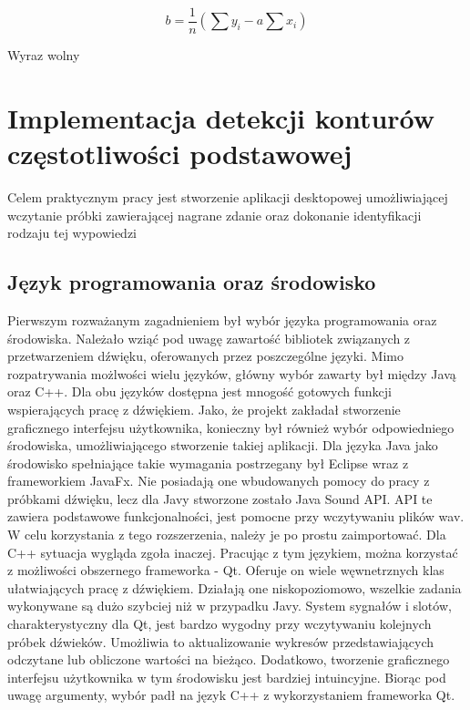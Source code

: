 \documentclass[a4paper,12 pt]{article}
\begin{document}
\begin{mycapequ}[h]

\begin{equation}
b = \frac{1}{n} (\sum{y_{i}} - a\sum{x_{i}})
\end{equation}
\caption{Wyraz wolny}
\end{mycapequ} 
\FloatBarrier

\section{Implementacja detekcji konturów częstotliwości podstawowej}
Celem praktycznym pracy jest stworzenie aplikacji desktopowej umożliwiającej wczytanie próbki zawierającej nagrane zdanie oraz dokonanie identyfikacji rodzaju tej wypowiedzi

\subsection{Język programowania oraz środowisko}
Pierwszym rozważanym zagadnieniem był wybór języka programowania oraz środowiska. Należało wziąć pod uwagę zawartość bibliotek związanych z przetwarzeniem dźwięku, oferowanych przez poszczególne języki.
Mimo rozpatrywania możlwości wielu języków, główny wybór zawarty był między Javą oraz C++. Dla obu języków dostępna jest mnogość gotowych funkcji wspierających pracę z dźwiękiem. Jako, że projekt zakładał stworzenie graficznego interfejsu użytkownika, 
konieczny był również wybór odpowiedniego środowiska, umożliwiającego stworzenie takiej aplikacji. Dla języka Java jako środowisko spełniające takie wymagania postrzegany był Eclipse wraz z frameworkiem JavaFx. Nie posiadają one wbudowanych pomocy do pracy z próbkami dźwięku, lecz dla Javy stworzone zostało
Java Sound API. API te zawiera podstawowe funkcjonalności, jest pomocne przy wczytywaniu plików wav. W celu korzystania z tego rozszerzenia, należy je po prostu zaimportować. Dla  C++ sytuacja wygląda zgoła inaczej. Pracując z tym językiem, można korzystać z możliwości obszernego frameworka - Qt. Oferuje on wiele węwnetrznych klas ułatwiających pracę z dźwiękiem. Działają one niskopoziomowo, wszelkie zadania wykonywane są dużo szybciej niż w przypadku Javy.  System sygnałów i slotów, charakterystyczny dla Qt, jest bardzo wygodny przy wczytywaniu kolejnych próbek dźwieków. Umożliwia to aktualizowanie wykresów przedstawiających odczytane lub obliczone wartości na bieżąco. Dodatkowo, tworzenie graficznego interfejsu użytkownika w tym środowisku jest bardziej intuincyjne. Biorąc pod uwagę argumenty, wybór padł na język C++ z wykorzystaniem frameworka Qt.
\end{document}
